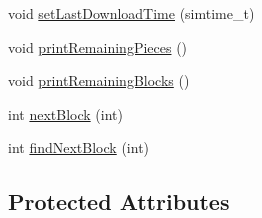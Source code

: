 \begin{DoxyCompactItemize}
\item 
void \hyperlink{classBitField_ac3ecb63ef77660a1a009dd835d3c9c02}{set\+Last\+Download\+Time} (simtime\+\_\+t)
\item 
void \hyperlink{classBitField_aceb7162148604b26efdd3be60c8930de}{print\+Remaining\+Pieces} ()
\item 
void \hyperlink{classBitField_ae79538d925f1fb7c45fbb71d3b9e6090}{print\+Remaining\+Blocks} ()
\item 
int \hyperlink{classBitField_a0f1d950ba2d78e2f589db52ecf002844}{next\+Block} (int)
\item 
int \hyperlink{classBitField_a47ff07b1fca1db8c8583f6111261d124}{find\+Next\+Block} (int)
\end{DoxyCompactItemize}
\subsection*{Protected Attributes}

